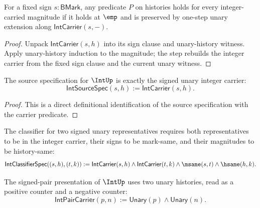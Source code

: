 \begin{theorem}
\label{thm:int-carrier-magnitude-induction}
For a fixed sign \(s:\mathsf{BMark}\), any predicate \(P\) on histories holds
for every integer-carried magnitude if it holds at \(\emp\) and is preserved
by one-step unary extension along \(\mathsf{IntCarrier}(s,-)\).
\end{theorem}
\begin{proof}
Unpack \(\mathsf{IntCarrier}(s,h)\) into its sign clause and unary-history
witness. Apply unary-history induction to the magnitude; the step rebuilds the
integer carrier from the fixed sign clause and the current unary witness.
\end{proof}

\begin{definition}
\label{def:intup-source-specification}
The source specification for \(\IntUp\) is exactly the signed unary integer carrier:
$$
  \mathsf{IntSourceSpec}(s,h)
  :=
  \mathsf{IntCarrier}(s,h).
$$
\end{definition}
\begin{proof}
This is a direct definitional identification of the source specification with the carrier predicate.
\end{proof}

\begin{definition}
\label{def:intup-classifier-specification}
The classifier for two signed unary representatives requires both representatives to be in the integer carrier, their signs to be mark-same, and their magnitudes to be history-same:
$$
  \mathsf{IntClassifierSpec}((s,h),(t,k))
  :=
  \mathsf{IntCarrier}(s,h)\land
  \mathsf{IntCarrier}(t,k)\land
  \msame(s,t)\land
  \hsame(h,k).
$$
\end{definition}

\begin{definition}
\label{def:intup-difference-pair-carrier}
The signed-pair presentation of $\IntUp$ uses two unary histories, read as a
positive counter and a negative counter:
$$
  \mathsf{IntPairCarrier}(p,n)
  :=
  \mathsf{Unary}(p)\land\mathsf{Unary}(n).
$$
\end{definition}

